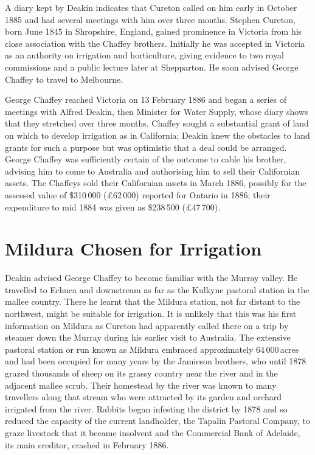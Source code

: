 A diary kept by Deakin indicates that Cureton called on him early in
October 1885 and had several meetings with him over three months.
Stephen Cureton, born June 1845 in Shropshire, England, gained
prominence in Victoria from his close association with the Chaffey
brothers.  Initially he was accepted in Victoria as an authority on
irrigation and horticulture, giving evidence to two royal commissions
and a public lecture later at Shepparton.  He soon advised George
Chaffey to travel to Melbourne.

George Chaffey reached Victoria on 13 February 1886 and began a series
of meetings with Alfred Deakin,  then Minister for
Water Supply, whose diary shows that they stretched over three
months. Chaffey sought a substantial grant of land on which to develop
irrigation as in California; Deakin knew the
obstacles to land grants for such a purpose but was optimistic that a
deal could be arranged.  George Chaffey was sufficiently certain of
the outcome to cable his brother, advising him to come to Australia
and authorising him to sell their Californian assets.  The Chaffeys
sold their Californian assets in March 1886, possibly for the assessed
value of \$310\,000 (\pounds62\,000) reported for Ontario in 1886;
their expenditure to mid 1884 was given as \$238\,500
(\pounds47\,700).

\section*{Mildura Chosen for Irrigation}

Deakin advised George Chaffey to become familiar with the Murray
valley.  He travelled to Echuca  and downstream as far as the Kulkyne pastoral station in the
mallee country.  There he learnt that the Mildura station, not far
distant to the northwest, might be suitable for irrigation.  It is
unlikely that this was his first information on Mildura as Cureton had
apparently called there on a trip by steamer down the Murray during
his earlier visit to Australia.  The extensive pastoral station or run
known as Mildura embraced approximately 64\,000\,acres and had been
occupied for many years by the Jamieson brothers, 
who until 1878 grazed thousands of sheep on its grassy
country near the river and in the adjacent mallee scrub.  Their
homestead by the river was known to many travellers along that stream
who were attracted by its garden and orchard irrigated from the river.
Rabbits began infesting the district by 1878 and so reduced the
capacity of the current landholder, the Tapalin Pastoral Company, to
graze livestock that it became insolvent and the
Commercial Bank of Adelaide, its main creditor, crashed
in February 1886.

